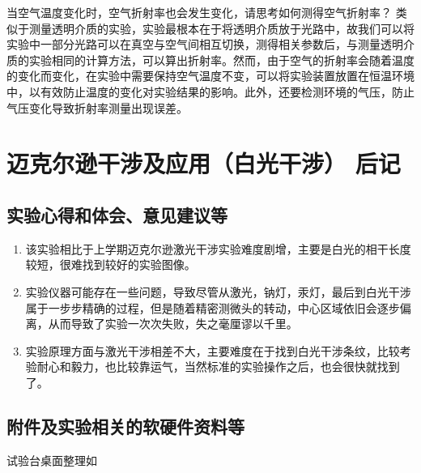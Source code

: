 \documentclass[dvipsnames, svgnames,a4paper,11pt]{article}
\begin{document}
	\begin{question}
		 当空气温度变化时，空气折射率也会发生变化，请思考如何测得空气折射率？
		 类似于测量透明介质的实验，实验最根本在于将透明介质放于光路中，故我们可以将实验中一部分光路可以在真空与空气间相互切换，测得相关参数后，与测量透明介质的实验相同的计算方法，可以算出折射率。然而，由于空气的折射率会随着温度的变化而变化，在实验中需要保持空气温度不变，可以将实验装置放置在恒温环境中，以有效防止温度的变化对实验结果的影响。此外，还要检测环境的气压，防止气压变化导致折射率测量出现误差。
	\end{question}
	
	
	\clearpage
	
	\section{迈克尔逊干涉及应用（白光干涉） \quad\heiti  后记}
	
	\subsection{实验心得和体会、意见建议等}
	\begin{enumerate}
		\item 该实验相比于上学期迈克尔逊激光干涉实验难度剧增，主要是白光的相干长度较短，很难找到较好的实验图像。
		\item 实验仪器可能存在一些问题，导致尽管从激光，钠灯，汞灯，最后到白光干涉属于一步步精确的过程，但是随着精密测微头的转动，中心区域依旧会逐步偏离，从而导致了实验一次次失败，失之毫厘谬以千里。
		\item 实验原理方面与激光干涉相差不大，主要难度在于找到白光干涉条纹，比较考验耐心和毅力，也比较靠运气，当然标准的实验操作之后，也会很快就找到了。
	\end{enumerate}
	
	
	
	\subsection{附件及实验相关的软硬件资料等}
	试验台桌面整理如%
	
	
\end{document}
